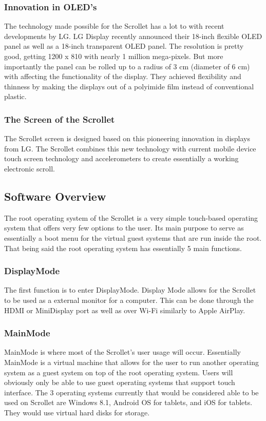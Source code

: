 \documentclass[a4paper]{article}
\begin{document}
\subsubsection{Innovation in OLED's}
The technology made possible for the Scrollet has a lot to with recent developments by LG. LG Display recently announced their 18-inch flexible OLED panel as well as a 18-inch transparent OLED panel. \cite{LG} The resolution is pretty good, getting 1200 x 810 with nearly 1 million mega-pixels. \cite{LG} But more importantly the panel can be rolled up to a radius of 3 cm (diameter of 6 cm) with affecting the functionality of the display. \cite{LG} They achieved flexibility and thinness by making the displays out of a polyimide film instead of conventional plastic. \cite{LG}

\subsubsection{The Screen of the Scrollet}
The Scrollet screen is designed based on this pioneering innovation in displays from LG. The Scrollet combines this new technology with current mobile device touch screen technology and accelerometers to create essentially a working electronic scroll.

\subsection{Software Overview}
The root operating system of the Scrollet is a very simple touch-based operating system that offers very few options to the user. Its main purpose to serve as essentially a boot menu for the virtual guest systems that are run inside the root. That being said the root operating system has essentially 5 main functions.

\subsubsection{DisplayMode}
The first function is to enter DisplayMode. Display Mode allows for the Scrollet to be used as a external monitor for a computer. This can be done through the HDMI or MiniDisplay port as well as over Wi-Fi similarly to Apple AirPlay.

\subsubsection{MainMode}
MainMode is where most of the Scrollet's user usage will occur. Essentially MainMode is a virtual machine that allows for the user to run another operating system as a guest system on top of the root operating system. Users will obviously only be able to use guest operating systems that support touch interface. The 3 operating systems currently that would be considered able to be used on Scrollet are Windows 8.1, Android OS for tablets, and iOS for tablets. They would use virtual hard disks for storage.
\end{document}
